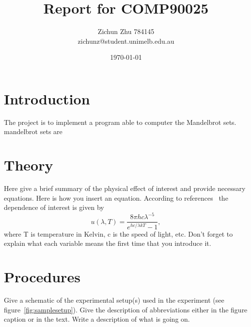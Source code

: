 \documentclass[letterpaper,12pt]{article}
\begin{document}
\title{Report for COMP90025}
\author{Zichun Zhu 784145\\
	\large zichunz@student.unimelb.edu.au}
\date{\today}
\maketitle

\section{Introduction}
The project is to implement a program able to computer the Mandelbrot sets. mandelbrot sets are 



\section{Theory}

Here give a brief summary of the physical effect of interest and provide
necessary equations. Here is how you insert an equation. According to
references~\cite{melissinos, Cyr, Wiki} the dependence of interest is given
by
\begin{equation} \label{eq:aperp} %
u(\lambda,T)=\frac{8\pi hc\lambda^{-5}}{e^{hc/\lambda kT}-1},
\end{equation}
where T is temperature in Kelvin, c is the speed of light, etc. Don't forget to
explain what each variable means the first time that you introduce it.


\section{Procedures}

Give a schematic of the experimental setup(s) used in the experiment (see
figure~\ref{fig:samplesetup}). Give the description of  abbreviations
either in the figure caption or in the text. Write a description of what is
going on. 
\end{document}
